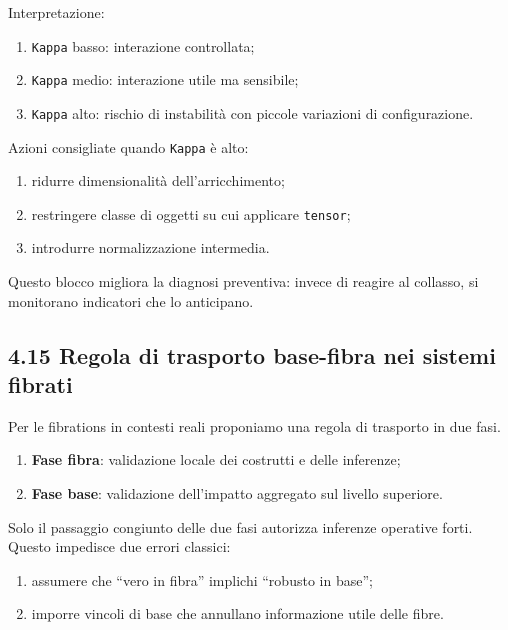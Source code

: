 Interpretazione:

\begin{enumerate}
\def\labelenumi{\arabic{enumi}.}
\tightlist
\item
  \texttt{Kappa} basso: interazione controllata;
\item
  \texttt{Kappa} medio: interazione utile ma sensibile;
\item
  \texttt{Kappa} alto: rischio di instabilità con piccole variazioni di configurazione.
\end{enumerate}

Azioni consigliate quando \texttt{Kappa} è alto:

\begin{enumerate}
\def\labelenumi{\arabic{enumi}.}
\tightlist
\item
  ridurre dimensionalità dell'arricchimento;
\item
  restringere classe di oggetti su cui applicare \texttt{tensor};
\item
  introdurre normalizzazione intermedia.
\end{enumerate}

Questo blocco migliora la diagnosi preventiva: invece di reagire al collasso, si monitorano indicatori che lo anticipano.

\subsection{4.15 Regola di trasporto base-fibra nei sistemi fibrati}

Per le fibrations in contesti reali proponiamo una regola di trasporto in due fasi.

\begin{enumerate}
\def\labelenumi{\arabic{enumi}.}
\tightlist
\item
  \textbf{Fase fibra}: validazione locale dei costrutti e delle inferenze;
\item
  \textbf{Fase base}: validazione dell'impatto aggregato sul livello superiore.
\end{enumerate}

Solo il passaggio congiunto delle due fasi autorizza inferenze operative forti.\\
Questo impedisce due errori classici:

\begin{enumerate}
\def\labelenumi{\arabic{enumi}.}
\tightlist
\item
  assumere che ``vero in fibra'' implichi ``robusto in base'';
\item
  imporre vincoli di base che annullano informazione utile delle fibre.
\end{enumerate}

